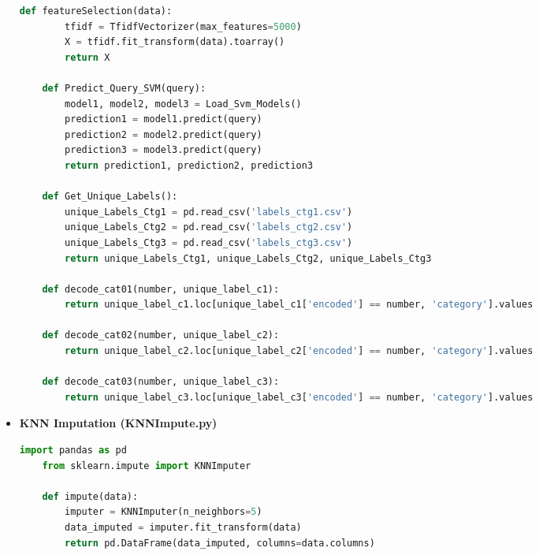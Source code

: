 \documentclass[10pt]{article}
\begin{document}
\begin{itemize}
\begin{lstlisting}[language=Python]
    def featureSelection(data):
        tfidf = TfidfVectorizer(max_features=5000)
        X = tfidf.fit_transform(data).toarray()
        return X
    
    def Predict_Query_SVM(query):
        model1, model2, model3 = Load_Svm_Models()
        prediction1 = model1.predict(query)
        prediction2 = model2.predict(query)
        prediction3 = model3.predict(query)
        return prediction1, prediction2, prediction3
    
    def Get_Unique_Labels():
        unique_Labels_Ctg1 = pd.read_csv('labels_ctg1.csv')
        unique_Labels_Ctg2 = pd.read_csv('labels_ctg2.csv')
        unique_Labels_Ctg3 = pd.read_csv('labels_ctg3.csv')
        return unique_Labels_Ctg1, unique_Labels_Ctg2, unique_Labels_Ctg3
    
    def decode_cat01(number, unique_label_c1):
        return unique_label_c1.loc[unique_label_c1['encoded'] == number, 'category'].values
    
    def decode_cat02(number, unique_label_c2):
        return unique_label_c2.loc[unique_label_c2['encoded'] == number, 'category'].values
    
    def decode_cat03(number, unique_label_c3):
        return unique_label_c3.loc[unique_label_c3['encoded'] == number, 'category'].values
    \end{lstlisting}

  \item \textbf{KNN Imputation (KNNImpute.py)}
    \begin{lstlisting}[language=Python]
    import pandas as pd
    from sklearn.impute import KNNImputer
    
    def impute(data):
        imputer = KNNImputer(n_neighbors=5)
        data_imputed = imputer.fit_transform(data)
        return pd.DataFrame(data_imputed, columns=data.columns)
    \end{lstlisting}
\end{itemize}
\end{document}
